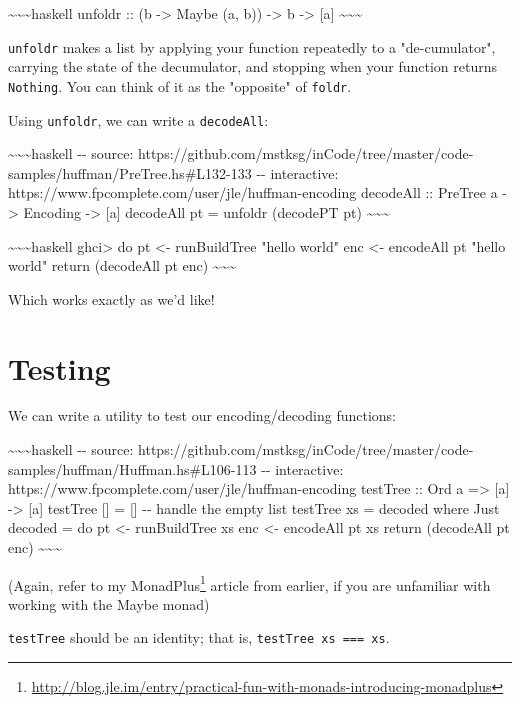 \documentclass[]{article}
\renewcommand{\href}[2]{#2\footnote{\url{#1}}}
\begin{document}
\textasciitilde{}\textasciitilde{}\textasciitilde{}haskell unfoldr :: (b
-\textgreater{} Maybe (a, b)) -\textgreater{} b -\textgreater{} {[}a{]}
\textasciitilde{}\textasciitilde{}\textasciitilde{}

\texttt{unfoldr} makes a list by applying your function repeatedly to a
"de-cumulator", carrying the state of the decumulator, and stopping when your
function returns \texttt{Nothing}. You can think of it as the "opposite" of
\texttt{foldr}.

Using \texttt{unfoldr}, we can write a \texttt{decodeAll}:

\textasciitilde{}\textasciitilde{}\textasciitilde{}haskell -\/- source:
https://github.com/mstksg/inCode/tree/master/code-samples/huffman/PreTree.hs\#L132-133
-\/- interactive: https://www.fpcomplete.com/user/jle/huffman-encoding decodeAll
:: PreTree a -\textgreater{} Encoding -\textgreater{} {[}a{]} decodeAll pt =
unfoldr (decodePT pt) \textasciitilde{}\textasciitilde{}\textasciitilde{}

\textasciitilde{}\textasciitilde{}\textasciitilde{}haskell ghci\textgreater{} do
pt \textless{}- runBuildTree "hello world" \textbar{} enc \textless{}- encodeAll
pt "hello world" \textbar{} return (decodeAll pt enc)
\textasciitilde{}\textasciitilde{}\textasciitilde{}

Which works exactly as we'd like!

\section{Testing}

We can write a utility to test our encoding/decoding functions:

\textasciitilde{}\textasciitilde{}\textasciitilde{}haskell -\/- source:
https://github.com/mstksg/inCode/tree/master/code-samples/huffman/Huffman.hs\#L106-113
-\/- interactive: https://www.fpcomplete.com/user/jle/huffman-encoding testTree
:: Ord a =\textgreater{} {[}a{]} -\textgreater{} {[}a{]} testTree {[}{]} =
{[}{]} -\/- handle the empty list testTree xs = decoded where Just decoded = do
pt \textless{}- runBuildTree xs enc \textless{}- encodeAll pt xs return
(decodeAll pt enc) \textasciitilde{}\textasciitilde{}\textasciitilde{}

(Again, refer to my
\href{http://blog.jle.im/entry/practical-fun-with-monads-introducing-monadplus}{MonadPlus}
article from earlier, if you are unfamiliar with working with the Maybe monad)

\texttt{testTree} should be an identity; that is,
\texttt{testTree\ xs\ ===\ xs}.
\end{document}
